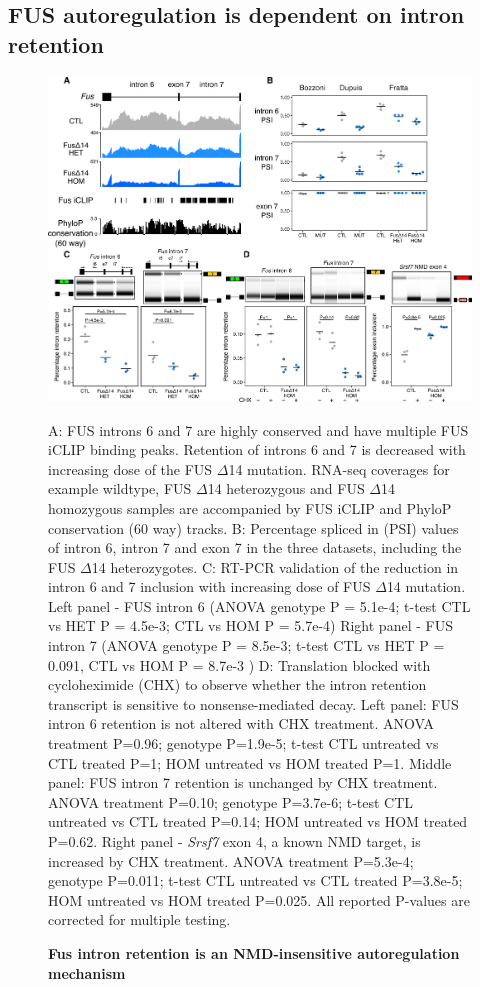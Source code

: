 \subsection{FUS autoregulation is dependent on intron retention}

\begin{figure}[h!]
	\centering
	\includegraphics[width=\textwidth]{Figures/06_fus_meta/Fus_autoregulation.png}
	\caption{\textbf{Fus intron retention is an NMD-insensitive autoregulation mechanism } }
		A: FUS introns 6 and 7 are highly conserved and have multiple FUS iCLIP binding peaks. 
		Retention of introns 6 and 7 is decreased with increasing dose of the FUS $\Delta$14 mutation. 
		RNA-seq coverages for example wildtype, FUS $\Delta$14 heterozygous and FUS $\Delta$14 homozygous samples are accompanied by FUS iCLIP and PhyloP conservation (60 way) tracks.
		B: Percentage spliced in (PSI) values of intron 6, intron 7 and exon 7 in the three datasets, including the FUS $\Delta$14 heterozygotes.
		C: RT-PCR validation of the reduction in intron 6 and 7 inclusion with increasing dose of FUS $\Delta$14 mutation. 
		Left panel - FUS intron 6 (ANOVA genotype P = 5.1e-4; t-test CTL vs HET P = 4.5e-3; CTL vs HOM P = 5.7e-4)
		Right panel - FUS intron 7 (ANOVA genotype P = 8.5e-3; t-test CTL vs HET P = 0.091, CTL vs HOM P = 8.7e-3 )
		D:	Translation blocked with cycloheximide (CHX) to observe whether the intron retention transcript is sensitive to nonsense-mediated decay. 
		Left panel: FUS intron 6 retention is not altered with CHX treatment. ANOVA treatment P=0.96; genotype P=1.9e-5; t-test CTL untreated vs CTL treated P=1; HOM untreated vs HOM treated P=1.
		Middle panel: FUS intron 7 retention is unchanged by CHX treatment. ANOVA treatment P=0.10; genotype P=3.7e-6; t-test CTL untreated vs CTL treated P=0.14; HOM untreated vs HOM treated P=0.62.
		Right panel - \textit{Srsf7} exon 4, a known NMD target, is increased by CHX treatment. ANOVA treatment P=5.3e-4; genotype P=0.011; t-test CTL untreated vs CTL treated P=3.8e-5; HOM untreated vs HOM treated P=0.025.
		All reported P-values are corrected for multiple testing.
	\label{fig:fus_autoregulation}
\end{figure}


